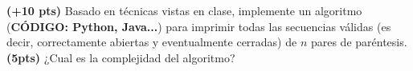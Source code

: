 \documentclass[12pt, a4paper]{exam}
\begin{document}
\begin{questions}
    \question \textbf{(+10 pts)} Basado en técnicas vistas en clase, implemente un
    algoritmo (\textbf{CÓDIGO: Python, Java...}) para imprimir todas las secuencias
    válidas (es decir, correctamente abiertas y eventualmente cerradas) de $n$ pares de
    paréntesis. \textbf{(5pts)} ¿Cual es la complejidad del algoritmo?
\end{questions}
\end{document}
